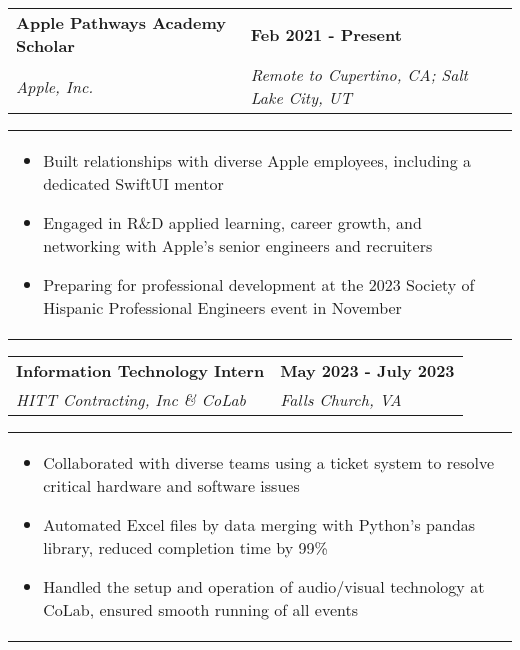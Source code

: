 \documentclass[10pt]{article}
\begin{document}
\noindent \begin{tabularx}{\textwidth}{X >{\raggedleft\arraybackslash}X}
\textbf{Apple Pathways Academy Scholar} & \textbf{Feb 2021 - Present} \\
\textit{Apple, Inc.}  & \textit{Remote to Cupertino, CA; Salt Lake City, UT} \\
\end{tabularx}

\vspace{-5pt}

\noindent \begin{tabularx}{\textwidth}{X}
\begin{itemize}[leftmargin=0.75cm, noitemsep, topsep=0pt, parsep=0pt, partopsep=0pt]
\item Built relationships with diverse Apple employees, including a dedicated SwiftUI mentor
\item Engaged in R\&D applied learning, career growth, and networking with Apple's senior engineers and recruiters
\item Preparing for professional development at the 2023 Society of Hispanic Professional Engineers event in November
\end{itemize}
\end{tabularx}


\vspace{-5pt}

\noindent \begin{tabularx}{\textwidth}{X >{\raggedleft\arraybackslash}X}
\textbf{Information Technology Intern}  & \textbf{May 2023 - July 2023} \\
\textit{HITT Contracting, Inc \& Co\textbar{}Lab} & \textit{Falls Church, VA} \\
\end{tabularx}

\vspace{-5pt}

\noindent \begin{tabularx}{\textwidth}{X}
\begin{itemize}[leftmargin=0.75cm, noitemsep, topsep=0pt, parsep=0pt, partopsep=0pt]
\item Collaborated with diverse teams using a ticket system to resolve critical hardware and software issues
\item Automated Excel files by data merging with Python's pandas library, reduced completion time by 99\%
\item Handled the setup and operation of audio/visual technology at Co\textbar{}Lab, ensured smooth running of all events
\end{itemize}
\end{tabularx}
\end{document}
